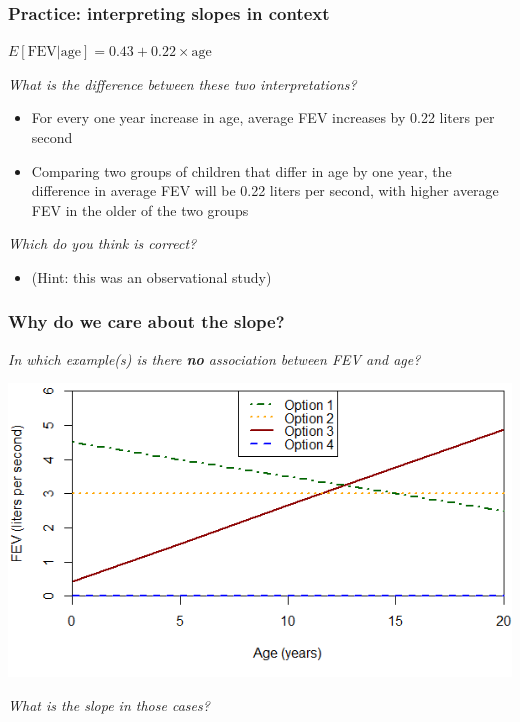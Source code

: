 \documentclass[12pt, 
hyperref={colorlinks=true, linkcolor=blue, urlcolor=cyan}]{beamer}
\begin{document}
\begin{frame}
\frametitle{Practice: interpreting slopes in context}

\begin{center} $E[\text{FEV} | \text{age}] = 0.43 + 0.22 \times \text{age}$ \end{center} 

\textit{What is the difference between these two interpretations?} \vspace{-0.3cm}
\begin{itemize}
\item For every one year increase in age, average FEV increases by 0.22 liters per second
\item Comparing two groups of children that differ in age by one year, the difference in average FEV will be 0.22 liters per second, with higher average FEV in the older of the two groups
\end{itemize} \pause

\textit{Which do you think is correct?} \vspace{-0.3cm} \pause 
\begin{itemize}
\item[] (Hint: this was an observational study)
\end{itemize}

\end{frame}

\begin{frame}
\frametitle{Why do we care about the slope?}

\begin{small} \textit{In which example(s) is there \textbf{no} association between FEV and age?} \vspace{-0.6cm} \end{small}

\hspace*{-0.6cm} \includegraphics[width=0.9\paperwidth]{./plots/association}

\pause
 \vspace{-0.7cm} \textit{What is the slope in those cases?}
\end{frame}
\end{document}
